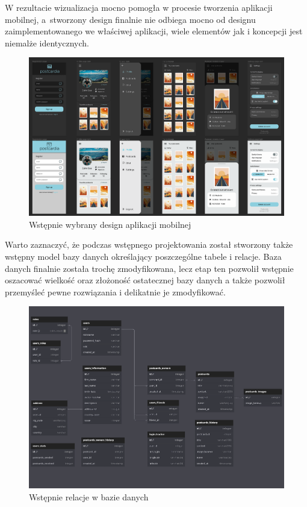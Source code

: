\documentclass[a4paper,twoside,12pt]{book}
\begin{document}
W rezultacie wizualizacja mocno pomogła w procesie tworzenia aplikacji mobilnej, a~stworzony design finalnie nie odbiega mocno od designu zaimplementowanego we właściwej aplikacji, wiele elementów jak i koncepcji jest niemalże identycznych.



\begin{figure}[H]
    \centering
    \includegraphics[width=1\textwidth]{wizje_ss/figma-designs.png}
    \caption{Wstępnie wybrany design aplikacji mobilnej}
\end{figure}
\newpage
Warto zaznaczyć, że podczas wstępnego projektowania został stworzony także wstępny model bazy danych określający poszczególne tabele i relacje. Baza danych finalnie została trochę zmodyfikowana, lecz etap ten pozwolił wstępnie oszacować wielkość oraz złożoność ostatecznej bazy danych a także pozwolił przemyśleć pewne rozwiązania i delikatnie je zmodyfikować.
\begin{figure}[H]
    \centering
    \includegraphics[width=1\textwidth]{wizje_ss/baza.png}
    \caption{Wstępnie relacje w bazie danych}
\end{figure}
\newpage
\end{document}
